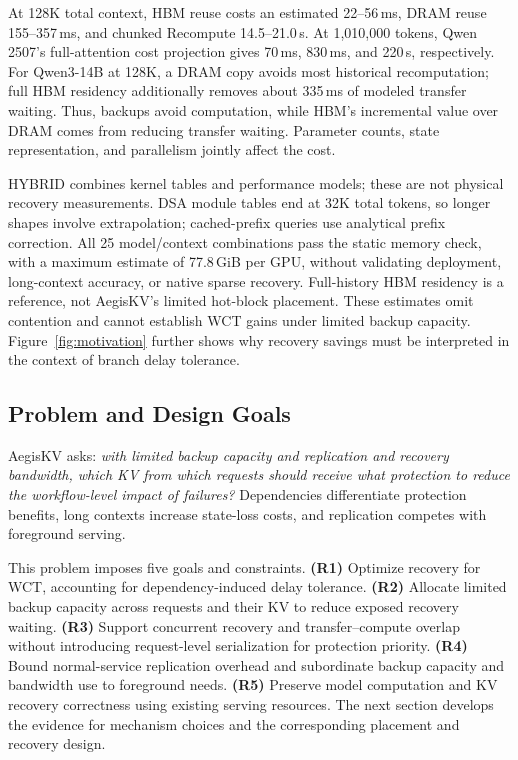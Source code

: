 At 128K total context, HBM reuse costs an estimated 22--56\,ms,
DRAM reuse 155--357\,ms, and chunked Recompute 14.5--21.0\,s.
At 1,010,000 tokens, Qwen 2507's full-attention cost projection gives
70\,ms, 830\,ms, and 220\,s, respectively. For Qwen3-14B at 128K,
a DRAM copy avoids most historical recomputation; full HBM residency
additionally removes about 335\,ms of modeled transfer waiting.
Thus, backups avoid computation, while HBM's incremental value over
DRAM comes from reducing transfer waiting. Parameter counts, state
representation, and parallelism jointly affect the cost.

HYBRID combines kernel tables and performance models; these are not
physical recovery measurements. DSA module tables end at 32K total
tokens, so longer shapes involve extrapolation; cached-prefix queries
use analytical prefix correction. All 25 model/context combinations
pass the static memory check, with a maximum estimate of 77.8\,GiB
per GPU, without validating deployment, long-context accuracy, or
native sparse recovery. Full-history HBM residency is a reference,
not AegisKV's limited hot-block placement. These estimates omit
contention and cannot establish WCT gains under limited backup capacity.
Figure~\ref{fig:motivation} further shows why recovery savings must be
interpreted in the context of branch delay tolerance.

\subsection{Problem and Design Goals}
\label{sec:motivation-goals}

AegisKV asks: \emph{with limited backup capacity and replication and
recovery bandwidth, which KV from which requests should receive what
protection to reduce the workflow-level impact of failures?}
Dependencies differentiate protection benefits, long contexts increase
state-loss costs, and replication competes with foreground serving.

This problem imposes five goals and constraints.
\textbf{(R1)} Optimize recovery for WCT, accounting for dependency-induced
delay tolerance.
\textbf{(R2)} Allocate limited backup capacity across requests and their
KV to reduce exposed recovery waiting.
\textbf{(R3)} Support concurrent recovery and transfer--compute overlap
without introducing request-level serialization for protection priority.
\textbf{(R4)} Bound normal-service replication overhead and subordinate
backup capacity and bandwidth use to foreground needs.
\textbf{(R5)} Preserve model computation and KV recovery correctness using
existing serving resources.
The next section develops the evidence for mechanism choices and the
corresponding placement and recovery design.
